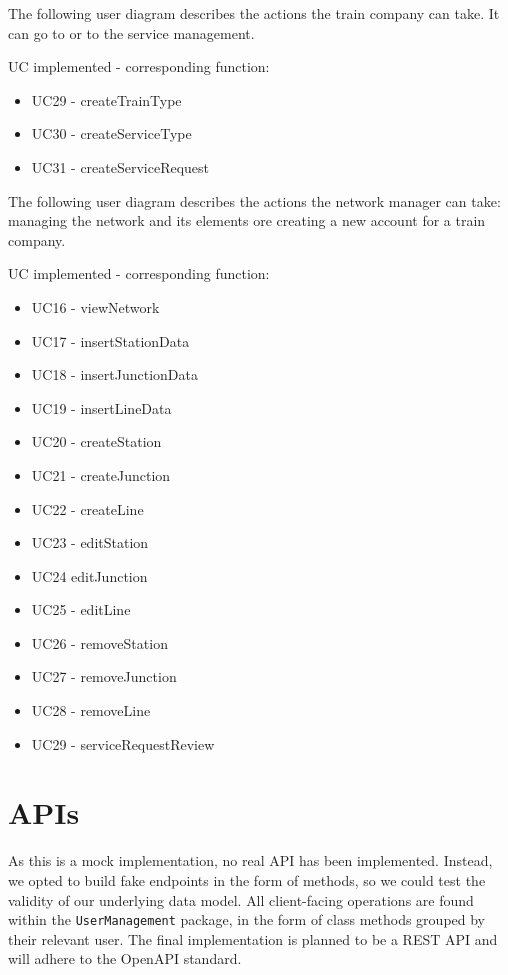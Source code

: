 \newpage
{}
The following user diagram describes the actions the train company can take. It can go to  or to the service management.


UC implemented - corresponding function:
\begin{itemize}
	\item UC29 - createTrainType
	\item UC30 - createServiceType
	\item UC31 - createServiceRequest
\end{itemize}

\newpage
{}
The following user diagram describes the actions the network manager can take: managing the network and its elements ore creating a new account for a train company.


UC implemented - corresponding function:
\begin{itemize}
	\item UC16 - viewNetwork
	\item UC17 - insertStationData
	\item UC18 - insertJunctionData
	\item UC19 - insertLineData
	\item UC20 - createStation
	\item UC21 - createJunction
	\item UC22 - createLine
	\item UC23 - editStation
	\item UC24 editJunction
	\item UC25 - editLine
	\item UC26 - removeStation
	\item UC27 - removeJunction
	\item UC28 - removeLine
	\item UC29 - serviceRequestReview
\end{itemize}

\newpage

\section{APIs}
As this is a mock implementation, no real API has been implemented. Instead, we opted to build fake endpoints in the form of methods, so we could test the validity of our underlying data model.
All client-facing operations are found within the \verb|UserManagement| package, in the form of class methods grouped by their relevant user. 
The final implementation is planned to be a REST API and will adhere to the OpenAPI standard.

